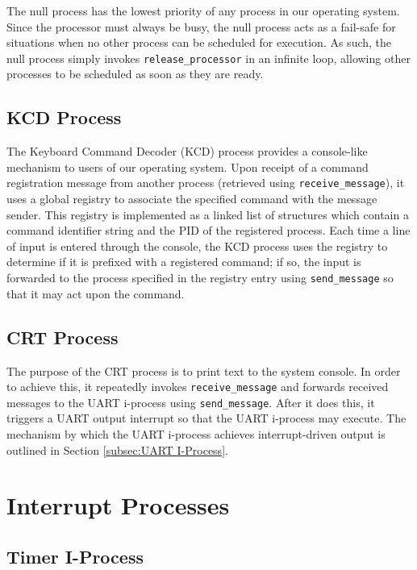 \documentclass[12pt]{report}
\begin{document}
The null process has the lowest priority of any process in our operating system. Since the processor must always be busy, the null process acts as a fail­-safe for situations when no other process can be scheduled for execution. As such, the null process simply invokes \texttt{release_processor} in an infinite loop, allowing other processes to be scheduled as soon as they are ready.

\subsection{KCD Process}

The Keyboard Command Decoder (KCD) process provides a console-like mechanism to users of our operating system. Upon receipt of a command registration message from another process (retrieved using \texttt{receive_message}), it uses a global registry to associate the specified command with the message sender. This registry is implemented as a linked list of structures which contain a command identifier string and the PID of the registered process. Each time a line of input is entered through the console, the KCD process uses the registry to determine if it is prefixed with a registered command; if so, the input is forwarded to the process specified in the registry entry using \texttt{send_message} so that it may act upon the command.

\subsection{CRT Process}

The purpose of the CRT process is to print text to the system console. In order to achieve this, it repeatedly invokes \texttt{receive_message} and forwards received messages to the UART i-process using \texttt{send_message}. After it does this, it triggers a UART output interrupt so that the UART i-process may execute. The mechanism by which the UART i-process achieves interrupt-driven output is outlined in Section \ref{subsec:UART I-Process}.

\section{Interrupt Processes}

\subsection{Timer I-Process}
\label{subsec:Timer I-Process}
\end{document}
